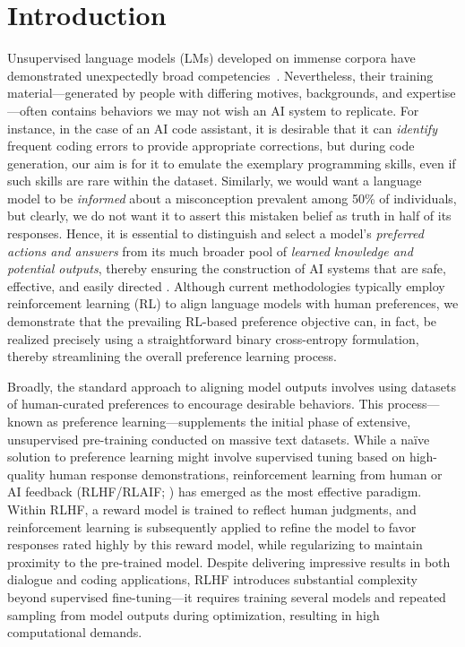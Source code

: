 \section{Introduction}
Unsupervised language models (LMs) developed on immense corpora have demonstrated unexpectedly broad competencies~\citep{chowdhery2022palm, brown2020language, touvron2023llama,bubeck2023sparks}. Nevertheless, their training material—generated by people with differing motives, backgrounds, and expertise—often contains behaviors we may not wish an AI system to replicate. For instance, in the case of an AI code assistant, it is desirable that it can \textit{identify} frequent coding errors to provide appropriate corrections, but during code generation, our aim is for it to emulate the exemplary programming skills, even if such skills are rare within the dataset. Similarly, we would want a language model to be \textit{informed} about a misconception prevalent among 50\% of individuals, but clearly, we do not want it to assert this mistaken belief as truth in half of its responses. Hence, it is essential to distinguish and select a model's \emph{preferred actions and answers} from its much broader pool of \textit{learned knowledge and potential outputs}, thereby ensuring the construction of AI systems that are safe, effective, and easily directed \citep{ouyang2022training}. Although current methodologies typically employ reinforcement learning (RL) to align language models with human preferences, we demonstrate that the prevailing RL-based preference objective can, in fact, be realized precisely using a straightforward binary cross-entropy formulation, thereby streamlining the overall preference learning process.

Broadly, the standard approach to aligning model outputs involves using datasets of human-curated preferences to encourage desirable behaviors. This process—known as preference learning—supplements the initial phase of extensive, unsupervised pre-training conducted on massive text datasets. While a naïve solution to preference learning might involve supervised tuning based on high-quality human response demonstrations, reinforcement learning from human or AI feedback (RLHF/RLAIF; \citep{christiano2017deep,bai2022constitutional}) has emerged as the most effective paradigm. Within RLHF, a reward model is trained to reflect human judgments, and reinforcement learning is subsequently applied to refine the model to favor responses rated highly by this reward model, while regularizing to maintain proximity to the pre-trained model. Despite delivering impressive results in both dialogue and coding applications, RLHF introduces substantial complexity beyond supervised fine-tuning—it requires training several models and repeated sampling from model outputs during optimization, resulting in high computational demands.

